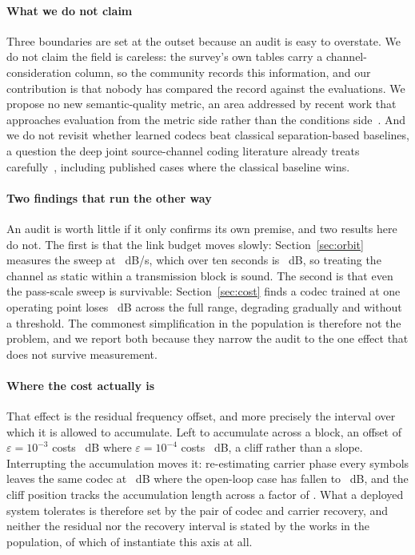 \documentclass[preprint,11pt,3p]{elsarticle}
\begin{document}
\paragraph{What we do not claim}
Three boundaries are set at the outset because an audit is easy to overstate. We do not claim the
field is careless: the survey's own tables carry a channel-consideration column, so the community
records this information, and our contribution is that nobody has compared the record against the
evaluations. We propose no new semantic-quality metric, an area addressed by recent work that
approaches evaluation from the metric side rather than the conditions side~\cite{metrics2026}. And we do not revisit
whether learned codecs beat classical separation-based baselines, a question the deep joint
source-channel coding literature already treats carefully~\cite{bourtsoulatze2019deepjscc,kurka2020deepjsccf},
including published cases where the classical baseline wins.

\paragraph{Two findings that run the other way}
An audit is worth little if it only confirms its own premise, and two results here do not. The
first is that the link budget moves slowly: Section~\ref{sec:orbit} measures the sweep at
\numSlew~dB/s, which over ten seconds is \numSlewTen~dB, so treating the channel as static
within a transmission block is sound. The second is that even the pass-scale sweep is survivable:
Section~\ref{sec:cost} finds a codec trained at one operating point loses \numPsnrDrop~dB
across the full range, degrading gradually and without a threshold. The commonest simplification
in the population is therefore not the problem, and we report both because they narrow the audit
to the one effect that does not survive measurement.

\paragraph{Where the cost actually is}
That effect is the residual frequency offset, and more precisely the interval over which it is
allowed to accumulate. Left to accumulate across a block, an offset of $\varepsilon = 10^{-3}$
costs \numDropCfoEb~dB where $\varepsilon = 10^{-4}$ costs \numDropCfoEa~dB, a cliff rather
than a slope. Interrupting the accumulation moves it: re-estimating carrier phase every
\numLprac{} symbols leaves the same codec at \numPsnrLlTt~dB where the open-loop case has fallen
to \numPsnrLlFth~dB, and the cliff position tracks the accumulation length across a factor of
\numLspan{}. What a deployed system tolerates is therefore set by the pair of codec and carrier
recovery, and neither the residual nor the recovery interval is stated by the works in the
population, of which \numEvDOPPLERRATE{} of \numCoded{} instantiate this axis at all.
\end{document}
